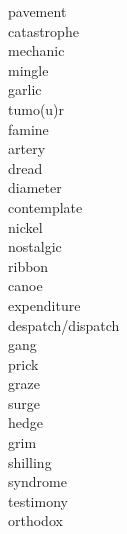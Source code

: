 \documentclass[b5paper, 11pt]{ctexart}
\begin{document}
\begin{multicols*}{3}
\begin{description}
\item[pavement]

\item[catastrophe]

\item[mechanic]

\item[mingle]

\item[garlic]

\item[tumo(u)r]

\item[famine]

\item[artery]

\item[dread]

\item[diameter]

\item[contemplate]

\item[nickel]

\item[nostalgic]

\item[ribbon]

\item[canoe]

\item[expenditure]

\item[despatch/dispatch]

\item[gang]

\item[prick]

\item[graze]

\item[surge]

\item[hedge]

\item[grim]

\item[shilling]

\item[syndrome]

\item[testimony]

\item[orthodox]


\end{description}
\end{multicols*}
\end{document}

